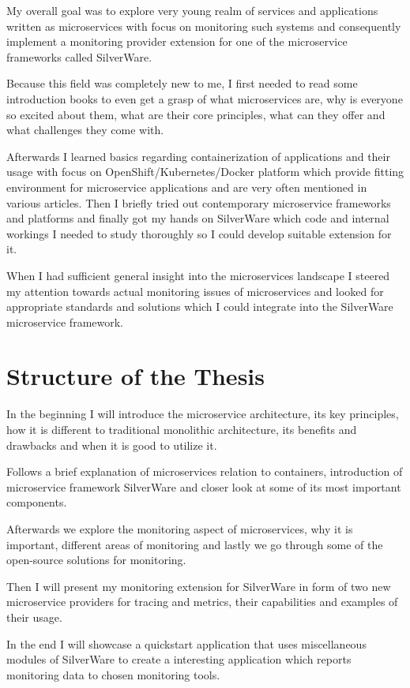 \documentclass[12pt,oneside]{fithesis2}
\begin{document}
My overall goal was to explore very young realm of services and applications written as microservices with focus on monitoring such systems and consequently implement a monitoring provider extension for one of the microservice frameworks called SilverWare.

Because this field was completely new to me, I first needed to read some introduction books to even get a grasp of what microservices are, why is everyone so excited about them, what are their core principles, what can they offer and what challenges they come with.

Afterwards I learned basics regarding containerization of applications and their usage with focus on OpenShift/Kubernetes/Docker platform which provide fitting environment for microservice applications and are very often mentioned in various articles. Then I briefly tried out contemporary microservice frameworks and platforms and finally got my hands on SilverWare which code and internal workings I needed to study thoroughly so I could develop suitable extension for it.

When I had sufficient general insight into the microservices landscape I steered my attention towards actual monitoring issues of microservices and looked for appropriate standards and solutions which I could integrate into the SilverWare microservice framework.

\section{Structure of the Thesis}

In the beginning I will introduce the microservice architecture, its key principles, how it is different to traditional monolithic architecture, its benefits and drawbacks and when it is good to utilize it.

Follows a brief explanation of microservices relation to containers, introduction of microservice framework SilverWare and closer look at some of its most important components.

Afterwards we explore the monitoring aspect of microservices, why it is important, different areas of monitoring and lastly we go through some of the open-source solutions for monitoring.

Then I will present my monitoring extension for SilverWare in form of two new microservice providers for tracing and metrics, their capabilities and examples of their usage.

In the end I will showcase a quickstart application that uses miscellaneous modules of SilverWare to create a interesting application which reports monitoring data to chosen monitoring tools.
\end{document}
